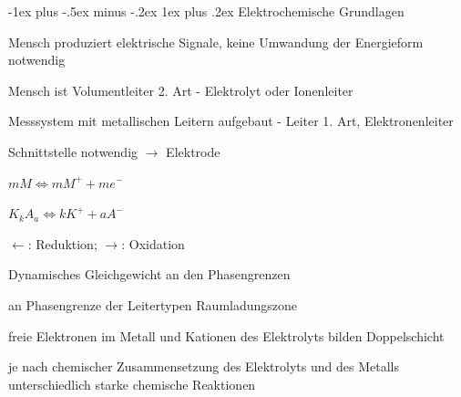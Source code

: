 \documentclass[a4paper]{article}
\makeatletter
\renewcommand{\subsubsection}{\@startsection{subsubsection}{3}{0mm}%
 {-1ex plus -.5ex minus -.2ex}%
 {1ex plus .2ex}%
 {\normalfont\small\bfseries}}
\makeatother
\begin{document}
\begin{multicols}{3}
  \subsubsection{Elektrochemische Grundlagen}\label{elektrochemische-grundlagen}
  \begin{itemize*}
    \item Mensch produziert elektrische Signale, keine Umwandung der Energieform notwendig
    \item Mensch ist Volumentleiter 2. Art - Elektrolyt oder Ionenleiter
    \item Messsystem mit metallischen Leitern aufgebaut - Leiter 1. Art, Elektronenleiter
    \item Schnittstelle notwendig $\rightarrow$ Elektrode
    \begin{itemize*}
      \item $mM \Leftrightarrow mM^+ + me^-$
      \item $K_k A_a\Leftrightarrow kK^+ + aA^-$
      \item $\leftarrow$: Reduktion; $\rightarrow$: Oxidation
      \item Dynamisches Gleichgewicht an den Phasengrenzen
    \end{itemize*}
    \item an Phasengrenze der Leitertypen Raumladungszone
    \item freie Elektronen im Metall und Kationen des Elektrolyts bilden Doppelschicht
    \item je nach chemischer Zusammensetzung des Elektrolyts und des Metalls unterschiedlich starke chemische Reaktionen %
  \end{itemize*}


\end{multicols}
\end{document}
